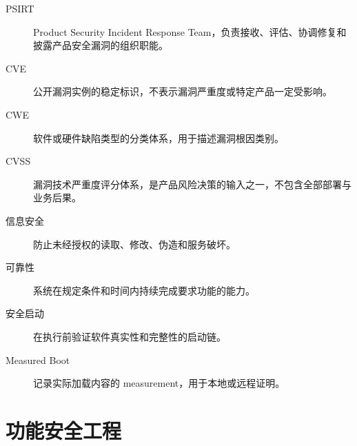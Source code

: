 \begin{description}
  \item[PSIRT] Product Security Incident Response Team，负责接收、评估、协调修复和披露产品安全漏洞的组织职能。
  \item[CVE] 公开漏洞实例的稳定标识，不表示漏洞严重度或特定产品一定受影响。
  \item[CWE] 软件或硬件缺陷类型的分类体系，用于描述漏洞根因类别。
  \item[CVSS] 漏洞技术严重度评分体系，是产品风险决策的输入之一，不包含全部部署与业务后果。
  \item[信息安全] 防止未经授权的读取、修改、伪造和服务破坏。
  \item[可靠性] 系统在规定条件和时间内持续完成要求功能的能力。
  \item[安全启动] 在执行前验证软件真实性和完整性的启动链。
  \item[Measured Boot] 记录实际加载内容的 measurement，用于本地或远程证明。
\end{description}

\section{功能安全工程}

